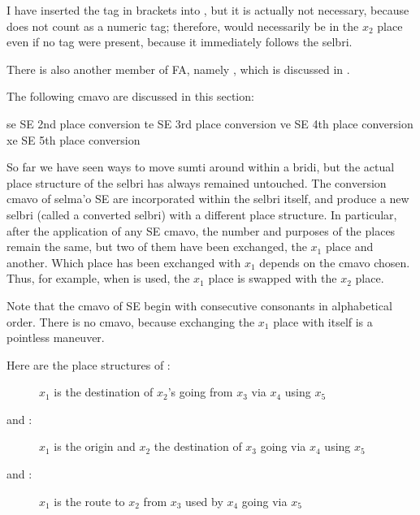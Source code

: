 I have inserted the tag  in brackets into , but it is actually not
    necessary, because  does not count as a numeric tag;
    therefore,  would necessarily be in the $x_2$ place
    even if no tag were present, because it immediately follows the
    selbri.

There is also another member of FA, namely , which is
    discussed in .



The following cmavo are discussed in this section:

   se  SE  2nd place conversion
    te  SE  3rd place conversion
    ve  SE  4th place conversion
    xe  SE  5th place conversion

So far we have seen ways to move sumti around within a bridi,
    but the actual place structure of the selbri has always
    remained untouched. The conversion cmavo of selma'o SE are
    incorporated within the selbri itself, and produce a new selbri
    (called a converted selbri) with a different place structure.
    In particular, after the application of any SE cmavo, the
    number and purposes of the places remain the same, but two of
    them have been exchanged, the $x_1$ place and another. Which place
    has been exchanged with $x_1$ depends on the cmavo chosen. Thus,
    for example, when  is used, the $x_1$ place is swapped with
    the $x_2$ place. 

Note that the cmavo of SE begin with consecutive consonants
    in alphabetical order. There is no 
    cmavo, because exchanging the $x_1$ place with itself is a
    pointless maneuver.

Here are the place structures of :
\begin{description}
\item[] $x_1$ is the destination of $x_2$'s going from $x_3$ via $x_4$ using $x_5$
\end{description}

and : 
\begin{description}
\item[] $x_1$ is the origin and $x_2$ the destination of $x_3$ going via $x_4$ using $x_5$
\end{description}

and : 
\begin{description}
\item[] $x_1$ is the route to $x_2$ from $x_3$ used by $x_4$ going via $x_5$
\end{description}

